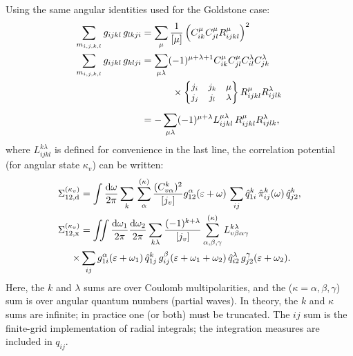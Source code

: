 \documentclass[10pt,twocolumn,a4paper]{article}%
\newcommand{\sixj}[6]{\small\ensuremath{\begin{Bmatrix}#1&#2&#3\\#4&#5&#6\end{Bmatrix}}}	%
\def\d{\ensuremath{{\rm d}}}
\def\en{\ensuremath{\varepsilon}}
\renewcommand{\a}{\ensuremath{\alpha}}
\renewcommand{\b}{\ensuremath{\beta}}
\newcommand{\g}{\ensuremath{\gamma}}
\renewcommand{\k}{\ensuremath{\kappa}}
\newcommand{\w}{\ensuremath{\omega}}
\begin{document}
Using the same angular identities used for the Goldstone case:
\begin{align}
\sum_{m_{i,j,k,l}}  g_{ijkl} \, g_{lkji}
    &= \sum_\mu \frac{1}{[\mu]} \left( C^\mu_{ik}C^\mu_{jl} R^\mu_{ijkl}\right)^2 \\
\sum_{m_{i,j,k,l}}  g_{ijkl} \, g_{klji}
        &=\sum_{\mu \lambda}(-1)^{\mu+\lambda+1}C^\mu_{ik}C^\mu_{jl}C^\lambda_{il}C^\lambda_{jk} \notag \\
    &\phantom{=\sum_{\mu \lambda}}~~\times \sixj{j_i}{j_k}{\mu}{j_j}{j_l}{\lambda}R^\mu_{ijkl}R^\lambda_{ijlk}\\
            &=-\sum_{\mu \lambda}(-1)^{\mu+\lambda}L^{\mu\lambda}_{ijkl} \, R^\mu_{ijkl}R^\lambda_{ijlk},
\end{align}
where $L^{k\lambda}_{ijkl}$ is defined for convenience in the last line,
the correlation potential (for angular state $\k_v$) can be written:
\begin{align}
\Sigma^{(\k_v)}_{12,{\rm d}}
&= \int\frac{\d \w}{2\pi} \sum_k\,\sum_{\alpha}^{(\kappa)} \frac{ (C^k_{v\a})^2}{[j_v]}
g^{\alpha}_{12}(\en+\w) \, \sum_{ij} \hat q^k_{1i} \, \hat \pi_{ij}^{k}(\w) \, \hat q^k_{j2},
\label{eq:RadialSigmaDir}
\\
\Sigma^{(\k_v)}_{12,{\rm x}}
&= \iint\frac{\d\w_1}{2\pi} \frac{\d\w_2}{2\pi} \sum_{k\lambda}\frac{(-1)^{k+\lambda}}{[j_v]}
\sum^{(\k)}_{\a,\b,\g} 
L_{v\b\a\g}^{k\lambda}
\notag\\
\times&\sum_{ij}  g^\a_{1i}(\en+\w_1)\,\hat q^k_{1j}\,g^\b_{ij}(\en+\w_1+\w_2)\,\hat q^\lambda_{i2}\,g^\g_{j2}(\en+\w_2).
\label{eq:RadialSigmaExch}
\end{align}
Here, the $k$ and $\lambda$ sums are over Coulomb multipolarities, and the ($\k=\a,\b,\g$) sum is over angular quantum numbers (partial waves).
In theory, the $k$ and $\kappa$ sums are infinite; in practice one (or both) must be truncated.
The $ij$ sum is the finite-grid implementation of radial integrals; the integration measures are included in $q_{ij}$.
\end{document}
